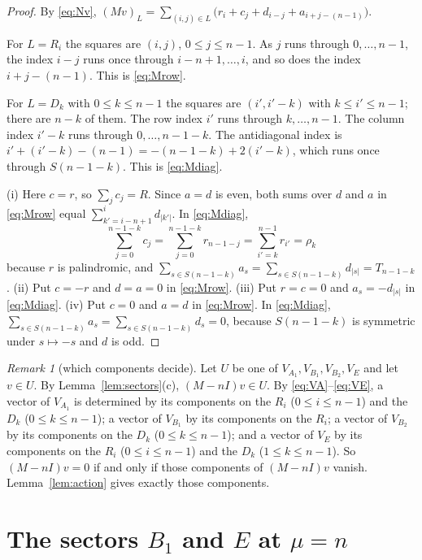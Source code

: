\documentclass[11pt]{amsart}
\theoremstyle{plain}
\theoremstyle{definition}
\theoremstyle{remark}
\newtheorem{remark}{Remark}
\numberwithin{equation}{section}
\newcommand{\abs}[1]{\lvert #1\rvert}
\newcommand{\VA}{V_{A_1}}
\newcommand{\VBa}{V_{B_1}}
\newcommand{\VBb}{V_{B_2}}
\newcommand{\VE}{V_{E}}
\begin{document}
\begin{proof}
By \eqref{eq:Nv}, \((Mv)_L=\sum_{(i,j)\in L}\bigl(r_i+c_j+d_{i-j}+a_{i+j-(n-1)}\bigr)\).

For \(L=R_i\) the squares are \((i,j)\), \(0\le j\le n-1\). As \(j\) runs through
\(0,\dots,n-1\), the index \(i-j\) runs once through \(i-n+1,\dots,i\), and so does the
index \(i+j-(n-1)\). This is \eqref{eq:Mrow}.

For \(L=D_k\) with \(0\le k\le n-1\) the squares are \((i',i'-k)\) with
\(k\le i'\le n-1\); there are \(n-k\) of them. The row index \(i'\) runs through
\(k,\dots,n-1\). The column index \(i'-k\) runs through \(0,\dots,n-1-k\). The
antidiagonal index is \(i'+(i'-k)-(n-1)=-(n-1-k)+2(i'-k)\), which runs once through
\(S(n-1-k)\). This is \eqref{eq:Mdiag}.

(i) Here \(c=r\), so \(\sum_jc_j=R\). Since \(a=d\) is even, both sums over \(d\) and
\(a\) in \eqref{eq:Mrow} equal \(\sum_{k'=i-n+1}^{i}d_{\abs{k'}}\). In \eqref{eq:Mdiag},
\[
\sum_{j=0}^{n-1-k}c_j=\sum_{j=0}^{n-1-k}r_{n-1-j}=\sum_{i'=k}^{n-1}r_{i'}=\rho_k
\]
because \(r\) is palindromic, and
\(\sum_{s\in S(n-1-k)}a_s=\sum_{s\in S(n-1-k)}d_{\abs{s}}=T_{n-1-k}\).
(ii) Put \(c=-r\) and \(d=a=0\) in \eqref{eq:Mrow}.
(iii) Put \(r=c=0\) and \(a_s=-d_{\abs{s}}\) in \eqref{eq:Mdiag}.
(iv) Put \(c=0\) and \(a=d\) in \eqref{eq:Mrow}. In \eqref{eq:Mdiag},
\(\sum_{s\in S(n-1-k)}a_s=\sum_{s\in S(n-1-k)}d_s=0\), because \(S(n-1-k)\) is symmetric
under \(s\mapsto-s\) and \(d\) is odd.
\end{proof}

\begin{remark}[which components decide]\label{rem:components}
Let \(U\) be one of \(\VA,\VBa,\VBb,\VE\) and let \(v\in U\). By
Lemma~\ref{lem:sectors}(c), \((M-nI)v\in U\). By \eqref{eq:VA}--\eqref{eq:VE}, a vector
of \(\VA\) is determined by its components on the \(R_i\) (\(0\le i\le n-1\)) and the
\(D_k\) (\(0\le k\le n-1\)); a vector of \(\VBa\) by its components on the \(R_i\); a
vector of \(\VBb\) by its components on the \(D_k\) (\(0\le k\le n-1\)); and a vector of
\(\VE\) by its components on the \(R_i\) (\(0\le i\le n-1\)) and the \(D_k\)
(\(1\le k\le n-1\)). So \((M-nI)v=0\) if and only if those components of \((M-nI)v\)
vanish. Lemma~\ref{lem:action} gives exactly those components.
\end{remark}

\section{The sectors \texorpdfstring{\(B_1\)}{B1} and \texorpdfstring{\(E\)}{E} at
\texorpdfstring{\(\mu=n\)}{mu=n}}\label{sec:B1E}
\end{document}
